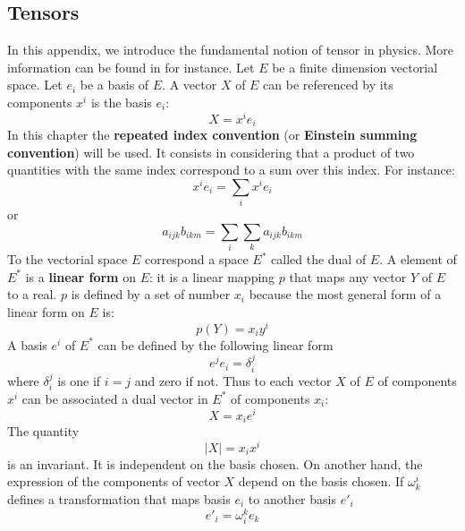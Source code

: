 \documentclass[12pt]{book}
\begin{document}
\subsection{Tensors}\label{chaptens}
In this appendix, we introduce the fundamental notion of
tensor in 
physics. More information can be found in \cite{ma:tense:Brillouin64}
for instance. 
Let $E$ be a finite dimension vectorial space.
Let $e_i$ be a basis of $E$.
A vector $X$ of $E$ can be referenced by its components $x^i$ is the basis
$e_i$: 
\begin{equation}
X=x^ie_i
\end{equation}
In this chapter the {\bf repeated index convention} (or {\bf Einstein summing
  convention}) 
will be used. It consists in considering that a product of two quantities with
the same index correspond to a sum over this index. For instance:
\begin{equation}
x^ie_i=\sum_i x^ie_i
\end{equation}
or
\begin{equation}
a_{ijk}b_{ikm}=\sum_i\sum_k a_{ijk}b_{ikm}
\end{equation}
To the vectorial space $E$ correspond a space $E^*$ called the dual of $E$. A
element of $E^*$ is a {\bf linear form} on $E$: it is a linear mapping $p$
that maps any vector $Y$ of $E$ to a real. $p$ is defined by a set of number
$x_i$ because the most general form of a linear form on $E$ is:
\begin{equation}
p(Y)=x_iy^i
\end{equation}
A basis $e^i$ of $E^*$ can be defined by the following linear form
\begin{equation}
e^je_i=\delta_i^j
\end{equation}
where $\delta_i^j$ is one if $i=j$ and zero if not.
Thus to each vector $X$ of $E$ of components $x^i$ can be associated a dual
vector in $E^*$ of components $x_i$:
\begin{equation}
X=x_ie^i
\end{equation}
The quantity
\begin{equation}
|X|=x_ix^i
\end{equation}
is an invariant. It is independent on the basis chosen.
On another hand, the expression of the components of vector $X$ depend on the
basis chosen. If $\omega_k^i$ defines a transformation that maps basis $e_i$
to another basis $e'_i$ 
\begin{equation}\label{eqcov}
e'_i=\omega^k_ie_k
\end{equation}
\end{document}
